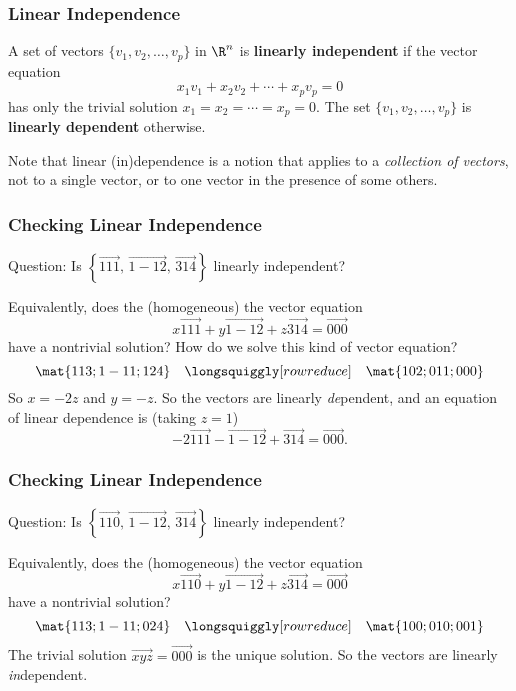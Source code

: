 \begin{frame}
\frametitle{Linear Independence}

\begin{minipage}{\textwidth}
\begin{defn}
  A set of vectors $\{v_1,v_2,\ldots,v_p\}$ in $\R^n$ is
  \textbf{linearly independent} if the vector equation
  \[ x_1v_1 + x_2v_2 + \cdots + x_pv_p = 0 \]
  has only the trivial solution $x_1=x_2=\cdots=x_p=0$.  
  The set
  $\{v_1,v_2,\ldots,v_p\}$ is \textbf{linearly dependent} otherwise.
\end{defn}
\end{minipage}

\bigskip
\begin{bluebox}{.7\linewidth}
  Note that linear (in)dependence is a notion that applies to a
  \emph{collection of vectors}, not to a single vector, or to one vector in the
  presence of some others.
\end{bluebox}

\end{frame}



\begin{frame}
\frametitle{Checking Linear Independence}

\alert{Question: } 
Is $\left\{ \vec{1 1 1},\, \vec{1 -1 2},\, \vec{3 1 4} \right\}$ linearly
independent?

\medskip
\begin{webonly}
Equivalently, does the (homogeneous) the vector equation
\[ x\vec{1 1 1} + y\vec{1 -1 2} + z\vec{3 1 4} = \vec{0 0 0} \]
have a nontrivial solution?
How do we solve this kind of vector equation?
\[ \mat{1 1 3; 1 -1 1; 1 2 4} 
\quad\longsquiggly[row reduce]\quad
\mat{1 0 2; 0 1 1; 0 0 0}
\]
So $x = -2z$ and $y = -z$.  So the vectors are
linearly \textit{de}pendent, and an equation of linear dependence is
(taking $z=1$)
\[ -2\vec{1 1 1} - \vec{1 -1 2} + \vec{3 1 4} = \vec{0 0 0}. \]
\end{webonly}

\end{frame}



\begin{frame}
\frametitle{Checking Linear Independence}

\alert{Question: } 
Is $\left\{ \vec{1 1 0},\, \vec{1 -1 2},\, \vec{3 1 4} \right\}$ linearly
independent?

\medskip
\begin{webonly}
Equivalently, does the (homogeneous) the vector equation
\[ x\vec{1 1 0} + y\vec{1 -1 2} + z\vec{3 1 4} = \vec{0 0 0} \]
have a nontrivial solution?
\[ \mat{1 1 3; 1 -1 1; 0 2 4} 
\quad\longsquiggly[row reduce]\quad
\mat{1 0 0; 0 1 0; 0 0 1}
\]
The trivial solution $\vec{x y z} = \vec{0 0 0}$ is the unique solution. 
So the vectors are linearly \textit{in}dependent.
\end{webonly}

\end{frame}


